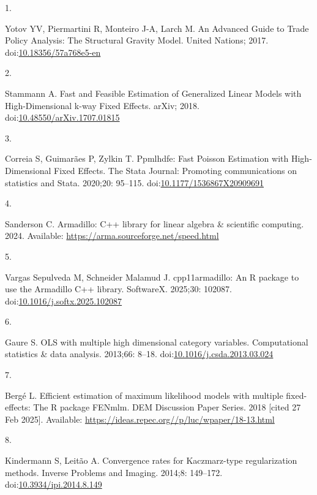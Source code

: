 \documentclass[
  10pt,
  letterpaper,
]{article}
\newlength{\cslhangindent}
\newlength{\csllabelwidth}
\newenvironment{CSLReferences}[2] %
 {\begin{list}{}{%
  \setlength{\itemindent}{0pt}
  \setlength{\leftmargin}{0pt}
  \setlength{\parsep}{0pt}
  \ifodd #1
   \setlength{\leftmargin}{\cslhangindent}
   \setlength{\itemindent}{-1\cslhangindent}
  \fi
  \setlength{\itemsep}{#2\baselineskip}}}
 {\end{list}}
\newcommand{\CSLLeftMargin}[1]{\parbox[t]{\csllabelwidth}{\strut#1\strut}}
\newcommand{\CSLRightInline}[1]{\parbox[t]{\linewidth - \csllabelwidth}{\strut#1\strut}}
\begin{document}
\label{refs}
\begin{CSLReferences}{0}{1}
\CSLLeftMargin{1. }%
\CSLRightInline{Yotov YV, Piermartini R, Monteiro J-A, Larch M. An
{Advanced} {Guide} to {Trade} {Policy} {Analysis}: {The} {Structural}
{Gravity} {Model}. United Nations; 2017.
doi:\href{https://doi.org/10.18356/57a768e5-en}{10.18356/57a768e5-en}}

\CSLLeftMargin{2. }%
\CSLRightInline{Stammann A. Fast and {Feasible} {Estimation} of
{Generalized} {Linear} {Models} with {High}-{Dimensional} k-way {Fixed}
{Effects}. arXiv; 2018.
doi:\href{https://doi.org/10.48550/arXiv.1707.01815}{10.48550/arXiv.1707.01815}}

\CSLLeftMargin{3. }%
\CSLRightInline{Correia S, Guimarães P, Zylkin T. Ppmlhdfe: {Fast}
{Poisson} {Estimation} with {High}-{Dimensional} {Fixed} {Effects}. The
Stata Journal: Promoting communications on statistics and Stata.
2020;20: 95--115.
doi:\href{https://doi.org/10.1177/1536867X20909691}{10.1177/1536867X20909691}}

\CSLLeftMargin{4. }%
\CSLRightInline{Sanderson C. Armadillo: {C}++ library for linear algebra
\& scientific computing. 2024. Available:
\url{https://arma.sourceforge.net/speed.html}}

\CSLLeftMargin{5. }%
\CSLRightInline{Vargas Sepulveda M, Schneider Malamud J. cpp11armadillo:
{An} {R} package to use the {Armadillo} {C}++ library. SoftwareX.
2025;30: 102087.
doi:\href{https://doi.org/10.1016/j.softx.2025.102087}{10.1016/j.softx.2025.102087}}

\CSLLeftMargin{6. }%
\CSLRightInline{Gaure S. {OLS} with multiple high dimensional category
variables. Computational statistics \& data analysis. 2013;66: 8--18.
doi:\href{https://doi.org/10.1016/j.csda.2013.03.024}{10.1016/j.csda.2013.03.024}}

\CSLLeftMargin{7. }%
\CSLRightInline{Bergé L. Efficient estimation of maximum likelihood
models with multiple fixed-effects: The {R} package {FENmlm}. DEM
Discussion Paper Series. 2018 {[}cited 27 Feb 2025{]}. Available:
\url{https://ideas.repec.org//p/luc/wpaper/18-13.html}}

\CSLLeftMargin{8. }%
\CSLRightInline{Kindermann S, Leitão A. Convergence rates for
{Kaczmarz}-type regularization methods. Inverse Problems and Imaging.
2014;8: 149--172.
doi:\href{https://doi.org/10.3934/ipi.2014.8.149}{10.3934/ipi.2014.8.149}}


\end{CSLReferences}
\end{document}

